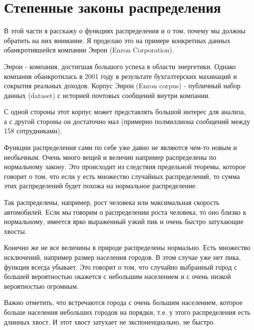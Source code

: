 \section{Степенные законы распределения}

В этой части я расскажу о функциях распределения и о том, почему мы должны обратить на них внимание. Я проделаю это на примере конкретных данных обанкротившейся компании Энрон (Enron Corporation).

Энрон - компания, достигшая большого успеха в области энергетики. Однако компания обанкротилась в 2001 году в результате бухгалтерских махинаций и сокрытия реальных доходов\cite{enron_fall}. Корпус Энрон (Enron corpus) - публичный набор данных (dataset) с историей почтовых сообщений внутри компании.

С одной стороны этот корпус может представлять большой интерес для анализа, а с другой стороны он достаточно мал (примерно полмиллиона сообщений между 158 сотрудниками\cite{sims_sinitsyn_matrix_structures}).

Функции распределения сами по себе уже давно не являются чем-то новым и необычным. Очень много вещей и величин например распределены по нормальному закону. Это происходит из следствия предельной теоремы, которое говорит о том, что если у есть множество случайных распределений, то сумма этих распределений будет похожа на нормальное распределение. 

Так распределены, например, рост человека или максимальная скорость автомобилей. Если мы говорим о распределении роста человека, то оно близко к нормальному, имеется ярко выраженный узкий пик и очень быстро затухающие хвосты. 




Конечно же не все величины в природе распределены нормально. Есть множество исключений, например размер населения городов. В этом случае уже нет пика, функция всегда убывает. Это говорит о том, что случайно выбранный город с большей вероятностью окажется с небольшим населением и с очень низкой вероятностью огромным. 


Важно отметить, что встречаются города с очень большим населением, которое больше населения небольших городов на порядки, т.е. у этого распределения есть длинных хвост. И этот хвост затухает не экспоненциально, не быстро. 

